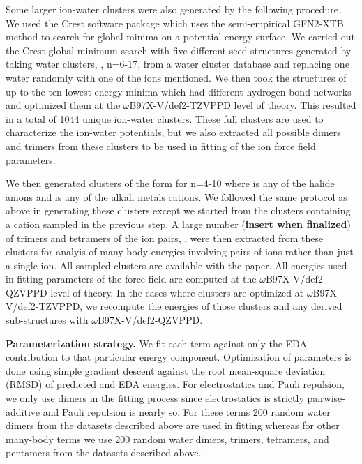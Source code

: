 \documentclass[journal=jctcce,manuscript=article]{achemso}
\begin{document}
Some larger ion-water clusters were also generated by the following procedure. We used the Crest software package\cite{pracht2020automated} which uses the semi-empirical GFN2-XTB\cite{bannwarth2019gfn2} method to search for global minima on a potential energy surface. We carried out the Crest global minimum search with five different seed structures generated by taking water clusters, , n=6-17, from a water cluster database\cite{rakshit2019atlas} and replacing one water randomly with one of the ions mentioned. We then took the structures of up to the ten lowest energy minima which had different hydrogen-bond networks and optimized them at the $\omega$B97X-V/def2-TZVPPD level of theory. This resulted in a total of 1044 unique ion-water clusters. These full clusters are used to characterize the ion-water potentials, but we also extracted all possible dimers and trimers from these clusters to be used in fitting of the ion force field parameters.

We then generated clusters of the form  for n=4-10 where  is any of the halide anions and  is any of the alkali metals cations. We followed the same protocol as above in generating these clusters except we started from the clusters containing a cation sampled in the previous step. A large number (\textbf{insert when finalized}) of trimers and tetramers of the ion pairs, , were then extracted from these clusters for analyis of many-body energies involving pairs of ions rather than just a single ion. All sampled clusters are available with the paper. All energies used in fitting parameters of the force field are computed at the $\omega$B97X-V/def2-QZVPPD level of theory. In the cases where clusters are optimized at $\omega$B97X-V/def2-TZVPPD, we recompute the energies of those clusters and any derived sub-structures with $\omega$B97X-V/def2-QZVPPD.

\textbf{Parameterization strategy.} We fit each term against only the EDA contribution to that particular energy component. Optimization of parameters is done using simple gradient descent against the root mean-square deviation (RMSD) of predicted and EDA energies. For electrostatics and Pauli repulsion, we only use dimers in the fitting process since electrostatics is strictly pairwise-additive and Pauli repulsion is nearly so. For these terms 200 random water dimers from the datasets described above are used in fitting whereas for other many-body terms we use 200 random water dimers, trimers, tetramers, and pentamers from the datasets described above.
\end{document}
